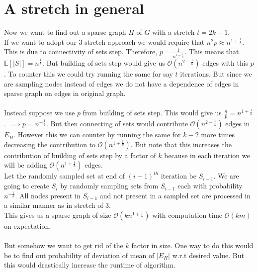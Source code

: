\documentclass[12pt]{article}
\begin{document}
\section{A stretch in general}
Now we want to find out a sparse graph $H$ of $G$ with a stretch $t = 2k - 1$.
\\
If we want to adopt our $3$ stretch approach we would require that $n^2p \approx n^{1 + \frac{1}{k}}$. This is due to connectivity of sets step. Therefore, $p = \frac{1}{n^{1 - \frac{1}{k}}}$. This means that $\mathbb{E}[|S|] = n^{\frac{1}{k}}$.
But building of sets step would give us $\mathcal{O}(n^{2 - \frac{1}{k}})$ edges with this $p$.
To counter this we could try running the same for say $t$ iterations. But since we are sampling nodes instead of edges we do not have a dependence of edges in sparse graph on edges in original graph.
\\
\
\\
Instead suppose we use $p$ from building of sets step. This would give us $\frac{n}{p} = n^{1 + \frac{1}{k}}$. $\implies p = n^{-\frac{1}{k}}$. But then connecting of sets would contribute $\mathcal{O}(n^{2 - \frac{1}{k}})$ edges in $E_H$. However this we can counter by running the same for $k - 2$ more times decreasing the contribution to $\mathcal{O}(n^{1 + \frac{1}{k}})$.
But note that this increases the contribution of building of sets step by a factor of $k$ because in each iteration we will be adding $\mathcal{O}(n^{1 + \frac{1}{k}})$ edges.
\\
Let the randomly sampled set at end of $(i - 1)^{th}$ iteration be $S_{i - 1}$. We are going to create $S_i$ by randomly sampling sets from $S_{i - 1}$ each with probability $n^{-\frac{1}{k}}$. All nodes present in $S_{i - 1}$ and not present in a sampled set are processed in a similar manner as in stretch of 3.
\\
This gives us a sparse graph of size $\mathcal{O}(kn^{1 + \frac{1}{k}})$ with computation time $\mathcal{O}(km)$ on expectation.
\\
\
\\
But somehow we want to get rid of the $k$ factor in size. One way to do this would be to find out probability of deviation of mean of $|E_H|$ w.r.t desired value. But this would drastically increase the runtime of algorithm.
\end{document}
